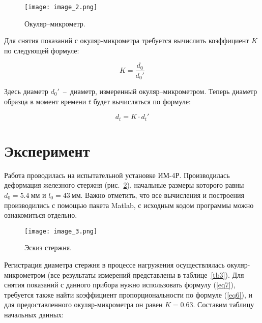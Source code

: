 \documentclass[12pt, a4paper]{article}
\begin{document}
    \begin{figure}[h]
        \centering
        \texttt{[image: image\_2.png]}
        \caption{Окуляр–микрометр.}
        \label{im2}
    \end{figure}
    
    Для снятия показаний с окуляр-микрометра требуется вычислить коэффициент $K$ по следующей формуле:
    
    \begin{equation}
        K = \frac{d_{0}}{d_{0}'}
        \label{eq6}
    \end{equation}
    
    Здесь диаметр $d_{0}'$~--~диаметр, измеренный окуляр–микрометром. Теперь диаметр образца в момент времени $t$ будет вычисляться по формуле:
    
    \begin{equation}
        d_{t} = K \cdot d_{t}'
        \label{eq7}
    \end{equation}
    
    \newpage
    
    \section{Эксперимент}
    
    Работа проводилась на испытательной установке ИМ-4Р. Производилась деформация железного стержня (рис.~\ref{im3}), начальные размеры которого равны $d_{0} = 5.4~\text{мм}$ и $l_{0} = 43~\text{мм}$. Важно отметить, что все вычисления и построения производились с помощью пакета Matlab, с исходным кодом программы можно ознакомиться отдельно.
    
    \begin{figure}[h]
        \centering
        \texttt{[image: image\_3.png]}
        \caption{Эскиз стержня.}
        \label{im3}
    \end{figure}
    
    Регистрация диаметра стержня в процессе нагружения осуществлялась окуляр-микрометром (все результаты измерений представлены в таблице~\ref{tb3}). Для снятия показаний с данного прибора нужно использовать формулу (\ref{eq7}), требуется также найти коэффициент пропорциональности по формуле (\ref{eq6}), и для предоставленного окуляр-микрометра он равен $K = 0.63$. Составим таблицу начальных данных:
    
\end{document}
